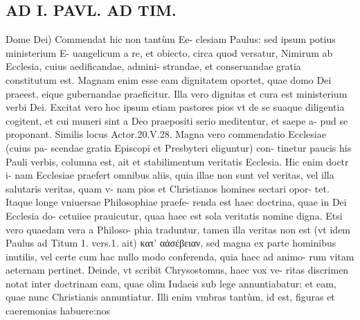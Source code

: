 \documentclass{article}
\begin{document}
\begin{pages}
\section*{AD I. PAVL. AD TIM. }
\marginpar{[ p.114 ]}\pstart Dome Dei) Commendat hic non tantùm Ee- clesiam Paulus: sed ipsum potius ministerium E- uangelicum a re, et obiecto, circa quod versatur, Nimirum ab Ecclesia, cuius aedificandae, admini- strandae, et conseruandae gratia constitutum est. Magnam enim esse eam dignitatem oportet, quae domo Dei praeest, eique gubernandae praeficitur. Illa vero dignitas et cura est ministerium verbi Dei. Excitat vero hoc ipsum etiam pastores pios vt de se suaque diligentia cogitent, et cui muneri sint a Deo praepositi serio meditentur, et saepe a- pud se proponant. Similis locus Actor.20.V.28. Magna vero commendatio Ecclesiae (cuius pa- scendae gratia Episcopi et Presbyteri eliguntur) con- tinetur paucis his Pauli verbis, columna est, ait et stabilimentum veritatis Ecclesia. Hic enim doctr i- nam Ecclesiae praefert omnibus aliis, quia illae non sunt vel veritas, vel illa salutaris veritas, quam v- nam pios et Christianos homines sectari opor- tet. Itaque longe vniuersae Philosophiae praefe- renda est haec doctrina, quae in Dei Ecclesia do- cetuiiee prauicutur, quaa haec est sola veritatis nomine digna. Etsi vero quaedam vera a Philoso- phia traduntur, tamen illa veritas non est (vt idem Paulus ad Titum 1. vers.1. ait) κατ' αἀσέβειαν, sed magna ex parte hominibus inutilis, vel certe cum hac nullo modo conferenda, quia haec ad animo- rum vitam aeternam pertinet. Deinde, vt scribit Chrysostomus, haec vox ve-  \pend\pstart ritas discrimen notat inter doctrinam eam, quae olim Iudaeis sub lege annuntiabatur: et eam, quae nunc Christianis annuntiatur. Illi enim vmbras tantùm, id est, figuras et caeremonias habuere:nos  \pend

\end{pages}
\end{document}
